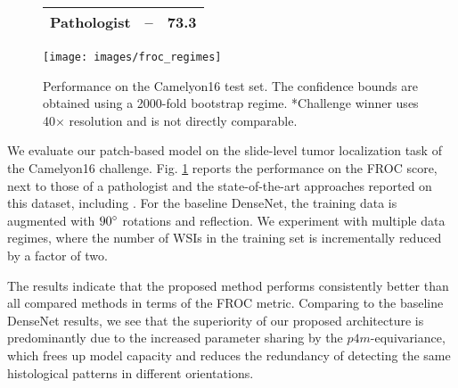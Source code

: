 \documentclass{llncs}
\begin{document}
\begin{figure}[t]
\begin{minipage}[b]{0.48\textwidth}
\begin{tabular}{@{}lll}
Pathologist   \cite{Ehteshami_Bejnordi2017-pt}       &     --             &    73.3                 \\ \bottomrule
\end{tabular}
    \captionsetup{labelformat=andtable}
    \caption{Performance on the Camelyon16 test set. The confidence bounds are obtained using a 2000-fold bootstrap regime. *Challenge winner \cite{Wang2016-yf} uses 40$\times$ resolution and is not directly comparable.}
    \label{fig:cam16}
\end{minipage}
\begin{minipage}[b]{0.44\textwidth}

\texttt{[image: images/froc\_regimes]}
\end{minipage}
\end{figure}







































We evaluate our patch-based model on the slide-level tumor localization task of the Camelyon16 challenge. Fig. \ref{fig:cam16} reports the performance on the FROC score, next to those of a pathologist \cite{Ehteshami_Bejnordi2017-pt} and the state-of-the-art approaches reported on this dataset, including \cite{Liu2017-jq,Wang2016-yf}. For the baseline DenseNet, the training data is augmented with $90\degree$ rotations and reflection. We experiment with multiple data regimes, where the number of WSIs in the training set is incrementally reduced by a factor of two. 

The results indicate that the proposed method performs consistently better than all compared methods in terms of the FROC metric. Comparing to the baseline DenseNet results, we see that the superiority of our proposed architecture is predominantly due to the increased parameter sharing by the $p4m$-equivariance, which frees up model capacity and reduces the redundancy of detecting the same histological patterns in different orientations.
\end{document}
